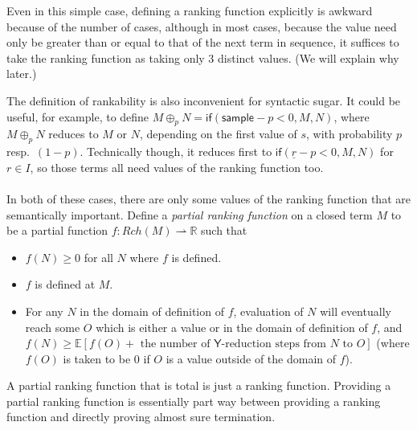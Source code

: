 \documentclass{article}
\newcommand{\tY}{\mathsf{Y}}
\newcommand{\tif}[3]{\mathsf{if}(#1, #2, #3)} %
\newcommand{\tsample}{\mathsf{sample}}
\theoremstyle{definition}
\theoremstyle{lemma}
\theoremstyle{remark}
\begin{document}
Even in this simple case, defining a ranking function explicitly is awkward because of the number of cases, although in most cases, because the value need only be greater than or equal to that of the next term in sequence, it suffices to take the ranking function as taking only 3 distinct values.
(We will explain why later.)

The definition of rankability is also inconvenient for syntactic sugar. It could be useful, for example, to define $M \oplus_p N = \tif{\tsample - p < 0} M N$, where $M \oplus_p N$ reduces to $M$ or $N$, depending on the first value of $s$, with probability $p$ resp.~$(1-p)$. Technically though, it reduces first to $\tif{\underline r - p < 0} M N$ for $r \in I$, so those terms all need values of the ranking function too.

\paragraph{}
In both of these cases, there are only some values of the ranking function that are semantically important. Define a \emph{partial ranking function} on a closed term $M$ to be a partial function $f : Rch(M) \rightharpoonup \mathbb R$ such that
\begin{itemize}
    \item $f(N) \geq 0$ for all $N$ where $f$ is defined.
    \item $f$ is defined at $M$.
    \item For any $N$ in the domain of definition of $f$, evaluation of $N$ will eventually  reach some $O$ which is either a value or in the domain of definition of $f$, and $f(N) \geq \mathbb E[f(O) + \text{ the number of $\tY$-reduction steps from $N$ to $O$}]$ (where $f(O)$ is taken to be 0 if $O$ is a value outside of the domain of $f$).
\end{itemize}
A partial ranking function that is total is just a ranking function. Providing a partial ranking function is essentially part way between providing a ranking function and directly proving almost sure termination.
\end{document}
